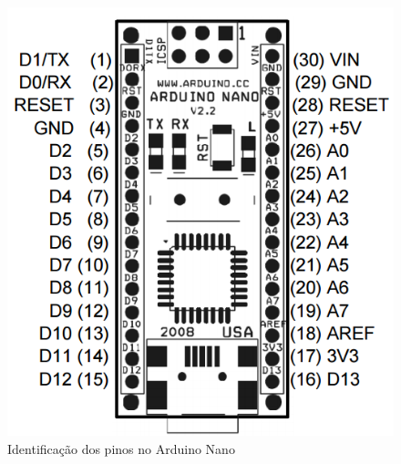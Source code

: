 \begin{figure}[h]
\begin{minipage}[b]{0.3\textwidth}
		\includegraphics[width=\textwidth]{img/hardware/nano-esquema.png}
		\caption{Identificação dos pinos no Arduino Nano}
		\label{ard1}
	\end{minipage}
\end{figure}








\newpage

